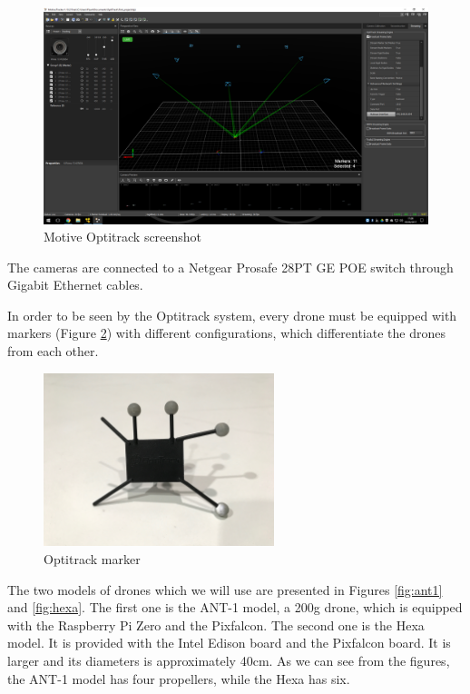\begin{figure}
\centering
\includegraphics[width=1.0\textwidth]{chapters/chapter-02/figures/cameras_square.png}
\caption{Motive Optitrack screenshot}
\label{fig:camera_square}
\end{figure}

The cameras are connected to a Netgear Prosafe 28PT GE POE \cite{netgear} switch through
Gigabit Ethernet cables.

In order to be seen by the Optitrack system, every drone must be equipped with
markers (Figure \ref{fig:marker}) with different configurations,
which differentiate the drones from each other.

\begin{figure}
\centering
\includegraphics[width=0.6\textwidth]{chapters/chapter-02/figures/marker.jpg}
\caption{Optitrack marker}
\label{fig:marker}
\end{figure}

The two models of drones which we will use are presented in Figures \ref{fig:ant1}
and \ref{fig:hexa}. The first one is the ANT-1 model, a 200g drone, which is
equipped with the Raspberry Pi Zero and the Pixfalcon.
The second one is the Hexa model. It is provided with the Intel Edison board and
the Pixfalcon board. It is larger and its diameters is approximately 40cm.
As we can see from the figures, the ANT-1 model has four propellers, while the Hexa
has six.

